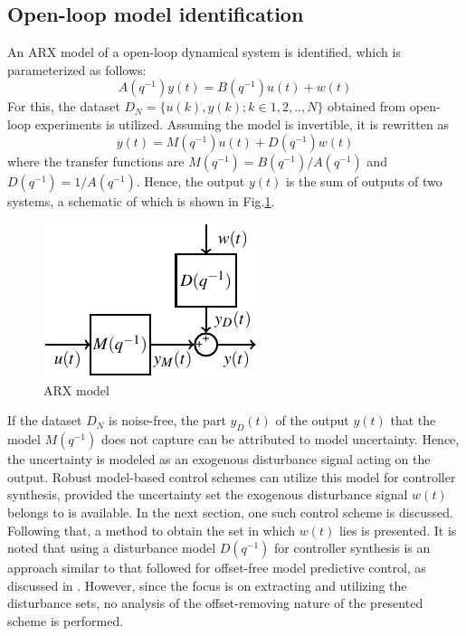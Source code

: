 \documentclass[letterpaper, 10 pt, conference]{ieeeconf}  %
\begin{document}
\subsection{Open-loop model identification}
An ARX model of a open-loop dynamical system is identified, which is parameterized as follows:
\begin{equation*} 
A(q^{-1})y(t)=B(q^{-1})u(t)+w(t)
\end{equation*}
For this, the dataset $D_N=\{u(k),y(k);k\in1,2,..,N\}$ obtained from open-loop experiments is utilized. Assuming the model is invertible, it is rewritten as
\begin{equation} 
y(t)=M(q^{-1})u(t)+D(q^{-1})w(t)
\label{tfmodel}
\end{equation}
where the transfer functions are $M(q^{-1})=B(q^{-1})/A(q^{-1})$ and $D(q^{-1})=1/A(q^{-1})$. Hence, the output $y(t)$ is the sum of outputs of two systems, a schematic of which is shown in Fig.\ref{fig:fullloop}.
	\begin{figure}[h]
		\vspace{-3pt}
		\hspace{45pt}
		\includegraphics[scale = 01.1]{final_robust.pdf}
		\caption{ARX model}
		\label{fig:fullloop}
	\end{figure} 
If the dataset $D_N$ is noise-free, the part $y_D(t)$ of the output $y(t)$ that the model $M(q^{-1})$ does not capture can be attributed to model uncertainty. Hence, the uncertainty is modeled as an exogenous disturbance signal acting on the output. Robust model-based control schemes can utilize this model for controller synthesis, provided the uncertainty set the exogenous disturbance signal $w(t)$ belongs to is available. In the next section, one such control scheme is discussed. Following that, a method to obtain the set in which $w(t)$ lies is presented. It is noted that using a disturbance model $D(q^{-1})$ for controller synthesis is an approach similar to that followed for offset-free model predictive control, as discussed in \cite{doi:10.1002/aic.690490213}. However, since the focus is on extracting and utilizing the disturbance sets, no analysis of the offset-removing nature of the presented scheme is performed.
\end{document}

